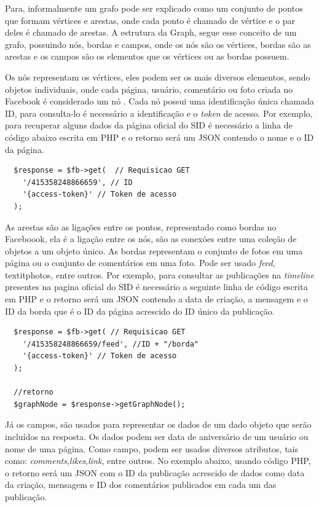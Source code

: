 
Para\cite{soares2014}, informalmente um grafo pode ser explicado como um conjunto de pontos que formam vértices e arestas, onde cada ponto é chamado de vértice e o par deles é chamado de arestas. A estrutura da Graph, segue esse conceito de um grafo, possuindo nós, bordas e campos, onde os nós são os vértices, bordas são as arestas e os campos são os elementos que os vértices ou as bordas possuem.

Os nós representam os vértices, eles podem ser os mais diversos elementos, sendo objetos individuais, onde cada página, usuário, comentário ou foto criada no Facebook é considerado um nó \cite{facebook2018b}. Cada nó possui uma identificação única chamada ID, para consulta-lo é necessário a identificação e o \textit{token} de acesso. Por exemplo, para recuperar alguns dados da página oficial do SID é necessário a linha de código abaixo escrita em PHP e o retorno será um JSON contendo o nome e o ID da página.

\begin{lstlisting}
  $response = $fb->get(  // Requisicao GET
    '/415358248866659', // ID
    '{access-token}' // Token de acesso
  );
\end{lstlisting}

As arestas são as ligações entre os pontos, representado como bordas no Faceboook, ela é a ligação entre os nós, são as conexões entre uma coleção de objetos a um objeto único. As bordas representam o conjunto de fotos em uma página ou o conjunto de comentários em uma foto. Pode ser usado \textit{feed}, textit{photos}, entre outros. Por exemplo, para consultar as publicações na \textit{timeline} presentes na pagina oficial do SID é necessário a seguinte linha de código escrita em PHP e o retorno será um JSON contendo a data de criação, a mensagem e o ID da borda que é o ID da página acrescido do ID único da publicação.

\begin{lstlisting}
  $response = $fb->get( // Requisicao GET
    '/415358248866659/feed', //ID + "/borda"
    '{access-token}' // Token de acesso
  );
  
  //retorno
  $graphNode = $response->getGraphNode();
\end{lstlisting}

Já os campos, são usados para representar os dados de um dado objeto que serão incluídos na resposta. Os dados podem ser data de aniversário de um usuário ou nome de uma página. Como campo, podem ser usados diversos atributos, tais como: \textit{comments},\textit{likes},\textit{link}, entre outros. No exemplo abaixo, usando código PHP, o retorno será um JSON com o ID da publicação acrescido de dados como data da criação, mensagem e ID dos comentários publicados em cada um das publicação.

